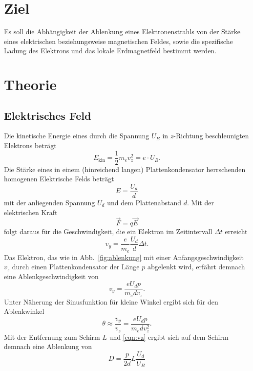 \section{Ziel}
\label{sec:Ziel}
Es soll die Abhängigkeit der Ablenkung eines Elektronenstrahls von der Stärke eines elektrischen beziehungsweise magnetischen Feldes, sowie die spezifische Ladung des Elektrons und das lokale Erdmagnetfeld bestimmt werden.

\section{Theorie}
\label{sec:theorie}

\subsection{Elektrisches Feld}
Die kinetische Energie eines durch die Spannung $U_B$ in $z$-Richtung beschleunigten Elektrons beträgt
\begin{equation}
  \label{eqn:vz}
  E_\text{kin} = \frac{1}{2} m_e v_z^2 = e \cdot U_B.
\end{equation}
Die Stärke eines in einem (hinreichend langen) Plattenkondensator herrschenden homogenen Elektrische Felds beträgt
\begin{equation}
  E = \frac{U_d}{d}
\end{equation}
mit der anliegenden Spannung $U_d$ und dem Plattenabstand $d$. Mit der elektrischen Kraft
\begin{equation}
  \vec F  = q \vec E
\end{equation}
folgt daraus für die Geschwindigkeit, die ein Elektron im Zeitintervall $\Delta t$ erreicht
\begin{equation}
  v_y = \frac{e}{m_e} \frac{U_d}{d} \Delta t.
\end{equation}
Das Elektron, das wie in Abb.~\ref{fig:ablenkung} mit einer Anfangsgeschwindigkeit $v_z$ durch einen Plattenkondensator der Länge $p$ abgelenkt wird, erfährt demnach eine Ablenkgeschwindigkeit von
\begin{equation}
  v_y = \frac{e U_d p}{m_e d v_z}.
\end{equation}
Unter Näherung der Sinusfunktion für kleine Winkel ergibt sich für den Ablenkwinkel
\begin{equation}
  \theta \approx \frac{v_y}{v_z} = \frac{e U_d p}{m_e d v_z^2}.
\end{equation}
Mit der Entfernung zum Schirm $L$ und \eqref{eqn:vz} ergibt sich auf dem Schirm demnach eine Ablenkung von
\begin{equation}
  \label{eqn:prop}
  D = \frac{p}{2d} L \frac{U_d}{U_B}
\end{equation}

